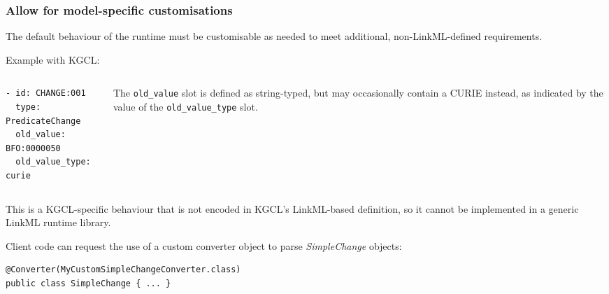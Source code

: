 \begin{frame}[fragile]
  \frametitle{Allow for model-specific customisations}

  \begin{block}{}
    The default behaviour of the runtime must be customisable as needed
    to meet additional, non-LinkML-defined requirements.
  \end{block}

  \bigskip
  Example with KGCL:
  \begin{columns}
    \begin{column}{.35\textwidth}
\begin{Verbatim}[frame=single,fontsize=\scriptsize]
- id: CHANGE:001
  type: PredicateChange
  old_value: BFO:0000050
  old_value_type: curie
\end{Verbatim}
    \end{column}
    \begin{column}{.60\textwidth}\small
    The \texttt{old\_value} slot is defined as string-typed, but may
    occasionally contain a CURIE instead, as indicated by the value of
    the \texttt{old\_value\_type} slot.
    \end{column}
  \end{columns}
  
  \bigskip
  This is a KGCL-specific behaviour that is not encoded in KGCL's
  LinkML-based definition, so it cannot be implemented in a generic
  LinkML runtime library.

  \bigskip
  Client code can request the use of a custom converter object to parse
  \emph{SimpleChange} objects:
\begin{Verbatim}[frame=single,fontsize=\scriptsize]
@Converter(MyCustomSimpleChangeConverter.class)
public class SimpleChange { ... }
\end{Verbatim}

\end{frame}

